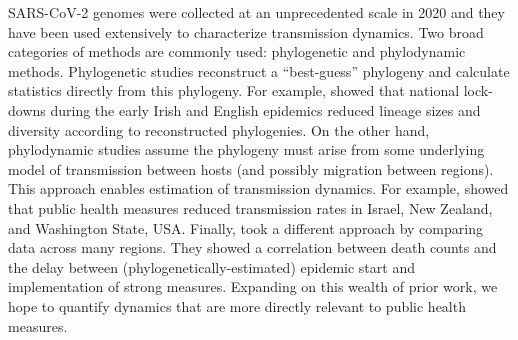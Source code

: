 \documentclass[9pt,twoside,lineno]{pnas-new} %
\begin{document}
SARS-CoV-2 genomes were collected at an unprecedented scale in 2020 \cite{Alm2020} and they have been used extensively to characterize transmission dynamics. Two broad categories of methods are commonly used: phylogenetic and phylodynamic methods. Phylogenetic studies reconstruct a ``best-guess'' phylogeny and calculate statistics directly from this phylogeny. For example, \cite{Mallon2020, duPlessis2021} showed that national lock-downs during the early Irish and English epidemics reduced lineage sizes and diversity according to reconstructed phylogenies. On the other hand, phylodynamic studies assume the phylogeny must arise from some underlying model of transmission between hosts (and possibly migration between regions). This approach enables estimation of transmission dynamics. For example, \cite{Miller2020, Geoghegan2020a, Muller2020a} showed that public health measures reduced transmission rates in Israel, New Zealand, and Washington State, USA. Finally, \cite{Ragonnet-Cronin2021} took a different approach by comparing data across many regions. They showed a correlation between death counts and the delay between (phylogenetically-estimated) epidemic start and implementation of strong measures. Expanding on this wealth of prior work, we hope to quantify dynamics that are more directly relevant to public health measures.

\end{document}
